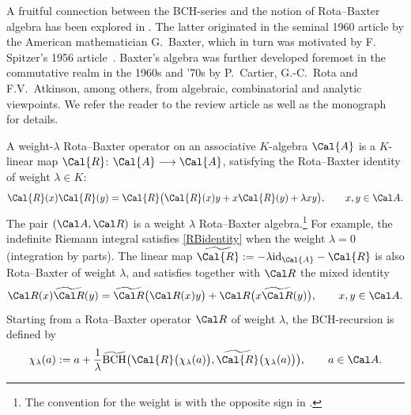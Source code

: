 \documentclass[pdftex]{sigma}
\numberwithin{equation}{section}
\begin{document}
A fruitful connection between the BCH-series and the notion of Rota--Baxter algebra has been explored in \cite{KLK04, KLK05, KLM06}. The latter originated in the seminal 1960 article \cite{B60} by the American mathematician G.~Baxter, which in turn was motivated by F. Spitzer's 1956 article~\cite{Sp56}. Baxter's algebra was further developed foremost in the commutative realm in the 1960s and '70s by P.~Cartier, G.-C.~Rota and F.V.~Atkinson, among others, from algebraic, combinatorial and analytic viewpoints. We refer the reader to the review article \cite{EP19} as well as the monograph~\cite{Guo12} for details.

A weight-$\lambda$ Rota--Baxter operator on an associative $K$-algebra $\Cal{A}$ is a $K$-linear map $\Cal{R}$: \mbox{$\Cal{A} \longrightarrow \Cal{A}$}, satisfying the Rota--Baxter identity of weight $\lambda \in K$:
\begin{equation}
\label{RBidentity}
\Cal{R}(x)\Cal{R}(y)
= \Cal{R} \big(\Cal{R}(x)y + x \Cal{R}(y) + \lambda xy \big), \qquad x,y \in\Cal A.
\end{equation}
The pair $(\Cal A,\Cal R)$ is a weight $\lambda$ Rota--Baxter algebra.\footnote{The convention for the weight is with the opposite sign in \cite{KLM06}.} For example, the indefinite Riemann integral satisfies \eqref{RBidentity} when the weight $\lambda=0$ (integration by parts). The linear map $\widetilde{\Cal{R}} := - \lambda {\rm id}_{\Cal{A}} - \Cal{R}$ is also Rota--Baxter of weight $\lambda$, and satisfies together with $\Cal R$ the mixed identity
\begin{displaymath}
\Cal R(x)\widetilde{\Cal R}(y)
=\widetilde{\Cal R}\big(\Cal R(x)y\big)+\Cal R\big(x\widetilde{\Cal R}(y)\big), \qquad x,y \in\Cal A.
\end{displaymath}
Starting from a Rota--Baxter operator $\Cal R$ of weight $\lambda$, the BCH-recursion \cite{KLM06} is defined by
\begin{equation}\label{rec.1}
\chi_{\lambda}(a) := a + \frac{1}{\lambda} \widetilde{{\rm BCH}}\big(\Cal{R}\big(\chi_{\lambda}(a)\big),
\widetilde{\Cal{R}}\big(\chi_{\lambda}(a)\big)\big),\qquad a\in\Cal A.
\end{equation}
\end{document}
